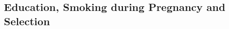 \documentclass[a4paper, 12 pt]{article}
\theoremstyle{plain}
\begin{document}
\begin{doublespace}
\subsection{Education, Smoking during Pregnancy and Selection}





\end{doublespace}
\end{document}
